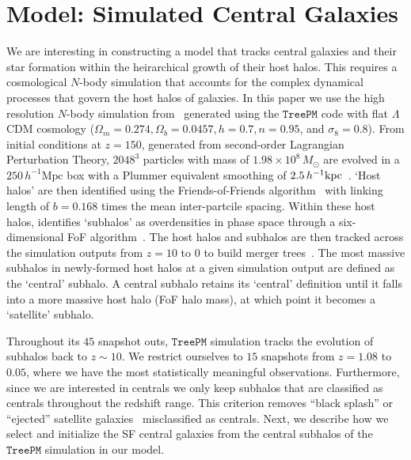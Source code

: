 \documentclass[12pt, letterpaper, preprint, tighten]{aastex62}
\newcommand{\edt}[1]{{\color{dred}{\bf} #1}}
\begin{document}
\section{Model: Simulated Central Galaxies} \label{sec:sim}
\edt{We are} interesting in constructing a model that tracks central galaxies and
their star formation within the heirarchical growth of their host halos. This
requires a cosmological $N$-body simulation that accounts for the complex
dynamical processes that govern the host halos of galaxies. In this paper
we use the high resolution $N$-body simulation from~\cite{wetzel2013} generated
using the \cite{white2002} $\mathtt{TreePM}$ code with flat $\Lambda$CDM cosmology
($\Omega_m =0.274, \Omega_b = 0.0457, h = 0.7, n=0.95$, and $\sigma_8 = 0.8$).
From initial conditions at $z = 150$, generated from second-order Lagrangian
Perturbation Theory, $2048^3$ particles with mass of $1.98 \times 10^8\,M_\odot$ are
evolved in a \edt{$250\,h^{-1}\mathrm{Mpc}$} box with a Plummer equivalent smoothing of
\edt{$2.5\,h^{-1}{\rm kpc}$}~\citep{wetzel2013, wetzel2014}. `Host halos' are then
identified using the Friends-of-Friends algorithm~\citep[FoF;][]{davis1985} with
linking length of $b{=}0.168$ times the mean inter-partcile spacing. Within
these host halos, \cite{wetzel2013} identifies `subhalos' as overdensities
in phase space through a six-dimensional FoF algorithm~\citep[FoF6D;][]{white2010}.
The host halos and subhalos are then tracked across the simulation outputs
from $z = 10$ to $0$ to build merger trees~\citep{wetzel2009,wetzel2010}.
The most massive subhalos in newly-formed host halos at a given simulation
output are defined as the `central' subhalo. A central subhalo retains its
`central' definition until it falls into a more massive host halo
\edt{(FoF halo mass)}, at which point it becomes a `satellite' subhalo.

Throughout its $45$ snapshot outs, $\mathtt{TreePM}$ simulation tracks
the evolution of subhalos back to $z \sim 10$. We restrict ourselves to $15$
snapshots from $z = 1.08$ to $0.05$, where we have the most statistically
meaningful observations. Furthermore, since we are interested in centrals we only
keep subhalos that are classified as centrals throughout the redshift
range. This criterion removes ``black splash'' or ``ejected'' satellite
galaxies~\citep[\emph{e.g.}][]{mamon2004,wetzel2014} misclassified as
centrals. Next, we describe how we select and initialize the SF central
galaxies from the central subhalos of the $\mathtt{TreePM}$
simulation in our model.
\end{document}
